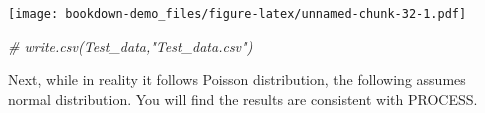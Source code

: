 \documentclass[]{book}
\newenvironment{Shaded}{\begin{snugshade}}{\end{snugshade}}
\newcommand{\CommentTok}[1]{\textcolor[rgb]{0.56,0.35,0.01}{\textit{#1}}}
\newcommand{\KeywordTok}[1]{\textcolor[rgb]{0.13,0.29,0.53}{\textbf{#1}}}
\newcommand{\NormalTok}[1]{#1}
\newcommand{\OperatorTok}[1]{\textcolor[rgb]{0.81,0.36,0.00}{\textbf{#1}}}
\begin{document}
\begin{Shaded}
\end{Shaded}

\texttt{[image: bookdown-demo\_files/figure-latex/unnamed-chunk-32-1.pdf]}

\begin{Shaded}
\begin{Highlighting}[]
\CommentTok{# write.csv(Test_data,"Test_data.csv")}
\end{Highlighting}
\end{Shaded}

Next, while in reality it follows Poisson distribution, the following assumes normal distribution. You will find the results are consistent with PROCESS.
\end{document}
